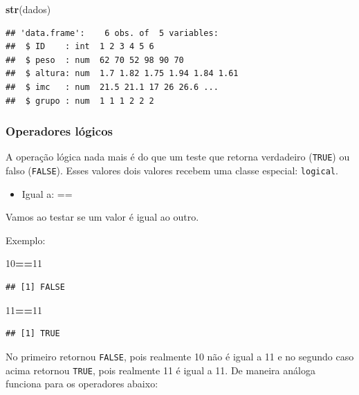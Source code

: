 \documentclass[
]{book}
\newenvironment{Shaded}{\begin{snugshade}}{\end{snugshade}}
\newcommand{\DecValTok}[1]{\textcolor[rgb]{0.00,0.00,0.81}{#1}}
\newcommand{\KeywordTok}[1]{\textcolor[rgb]{0.13,0.29,0.53}{\textbf{#1}}}
\newcommand{\NormalTok}[1]{#1}
\newcommand{\OperatorTok}[1]{\textcolor[rgb]{0.81,0.36,0.00}{\textbf{#1}}}
\providecommand{\tightlist}{%
  \setlength{\itemsep}{0pt}\setlength{\parskip}{0pt}}
\begin{document}
\begin{Shaded}
\begin{Highlighting}[]
\KeywordTok{str}\NormalTok{(dados)}
\end{Highlighting}
\end{Shaded}

\begin{verbatim}
## 'data.frame':	6 obs. of  5 variables:
##  $ ID    : int  1 2 3 4 5 6
##  $ peso  : num  62 70 52 98 90 70
##  $ altura: num  1.7 1.82 1.75 1.94 1.84 1.61
##  $ imc   : num  21.5 21.1 17 26 26.6 ...
##  $ grupo : num  1 1 1 2 2 2
\end{verbatim}

\hypertarget{operadores-luxf3gicos}{%
\subsubsection{Operadores lógicos}\label{operadores-luxf3gicos}}

A operação lógica nada mais é do que um teste que retorna verdadeiro (\texttt{TRUE}) ou falso (\texttt{FALSE}). Esses valores dois valores recebem uma classe especial: \texttt{logical}.

\begin{itemize}
\tightlist
\item
  Igual a: ==
\end{itemize}

Vamos ao testar se um valor é igual ao outro.

Exemplo:

\begin{Shaded}
\begin{Highlighting}[]
\DecValTok{10}\OperatorTok{==}\DecValTok{11}
\end{Highlighting}
\end{Shaded}

\begin{verbatim}
## [1] FALSE
\end{verbatim}

\begin{Shaded}
\begin{Highlighting}[]
\DecValTok{11}\OperatorTok{==}\DecValTok{11}
\end{Highlighting}
\end{Shaded}

\begin{verbatim}
## [1] TRUE
\end{verbatim}

No primeiro retornou \texttt{FALSE}, pois realmente 10 não é igual a 11 e no segundo caso acima retornou \texttt{TRUE}, pois realmente 11 é igual a 11.
De maneira análoga funciona para os operadores abaixo:
\end{document}
